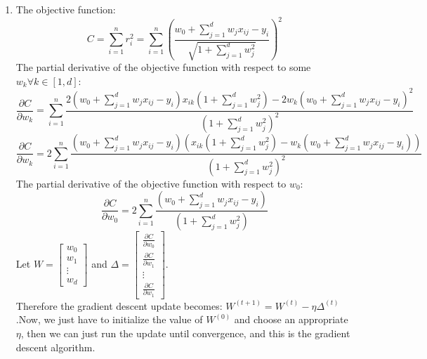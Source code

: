 \documentclass[twoside]{article}
\begin{document}
\begin{enumerate}
    \item
    The objective function:
    \begin{equation*}
        C = \sum_{i = 1}^n r_i^2 = \sum_{i = 1}^n \left( \frac{w_0 + \sum_{j = 1}^d w_j x_{ij} - y_i}{\sqrt{1 + \sum_{j=1}^d w_j^2}} \right)^2
    \end{equation*}
    The partial derivative of the objective function with respect to some $w_k \forall k \in [1,d]$:
    \begin{equation*}
        \frac{\partial C}{\partial w_k} =  \sum_{i = 1}^n \frac{2(w_0 + \sum_{j=1}^d w_j x_{ij} -y_i)x_{ik}(1 + \sum_{j=1}^d w_j^2) - 2w_k(w_0 + \sum_{j=1}^d w_j x_{ij} -y_i)^2}{(1 + \sum_{j=1}^d w_j^2)^2}
    \end{equation*}
    \begin{equation*}
    	\frac{\partial C}{\partial w_k} =  2\sum_{i = 1}^n \frac{(w_0 + \sum_{j=1}^d w_j x_{ij} -y_i)\left(x_{ik}(1 + \sum_{j=1}^d w_j^2) - w_k(w_0 + \sum_{j=1}^d w_j x_{ij} -y_i)\right)}{(1 + \sum_{j=1}^d w_j^2)^2}
    \end{equation*}
    The partial derivative of the objective function with respect to $w_0$:
    \begin{equation*}
    	\frac{\partial C}{\partial w_0} = 2\sum_{i = 1}^n \frac{(w_0 + \sum_{j=1}^d w_j x_{ij} -y_i)}{(1 + \sum_{j=1}^d w_j^2)}
    \end{equation*}
    Let $W = \begin{bmatrix} w_0\\w_1\\ \vdots\\ w_d \end{bmatrix}$ and $\Delta = \begin{bmatrix} \frac{\partial C}{\partial w_0}\\\frac{\partial C}{\partial w_1}\\ \vdots\\ \frac{\partial C}{\partial w_1} \end{bmatrix}$.\\
    Therefore the gradient descent update becomes: $W^{(t+1)} = W^{(t)} - \eta \Delta ^ {(t)}$.Now, we just have to initialize the value of $W^{(0)}$ and choose an appropriate $\eta$, then we can just run the update until convergence, and this is the gradient descent algorithm.
    
    
\end{enumerate}
\end{document}
